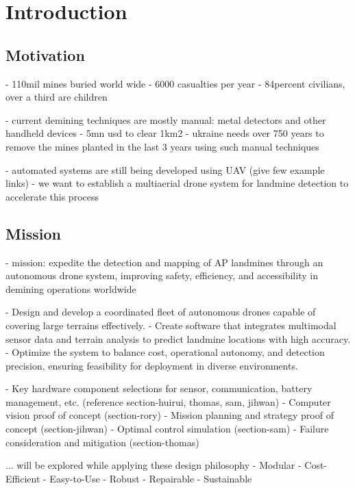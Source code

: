 \section{Introduction} \label{introduction}

\subsection{Motivation}

- 110mil mines buried world wide
- 6000 casualties per year
- 84percent civilians, over a third are children

- current demining techniques are mostly manual: metal detectors and other handheld devices
- 5mn usd to clear 1km2
- ukraine needs over 750 years to remove the mines planted in the last 3 years using such manual techniques

- automated systems are still being developed using UAV (give few example links)
- we want to establish a multiaerial drone system for landmine detection to accelerate this process

\cite{icbl2024landmine}
\cite{globsec2024ukraine}

\subsection{Mission}

- mission: expedite the detection and mapping of AP landmines through an autonomous drone system, improving safety, efficiency, and accessibility in demining operations worldwide

- Design and develop a coordinated fleet of autonomous drones capable of covering large terrains effectively.
- Create software that integrates multimodal sensor data and terrain analysis to predict landmine locations with high accuracy.
- Optimize the system to balance cost, operational autonomy, and detection precision, ensuring feasibility for deployment in diverse environments.

- Key hardware component selections for sensor, communication, battery management, etc. (reference section-huirui, thomas, sam, jihwan)
- Computer vision proof of concept (section-rory)
- Mission planning and strategy proof of concept (section-jihwan)
- Optimal control simulation (section-sam)
- Failure consideration and mitigation (section-thomas)

... will be explored while applying these design philosophy
- Modular
- Cost-Efficient
- Easy-to-Use
- Robust
- Repairable
- Sustainable
